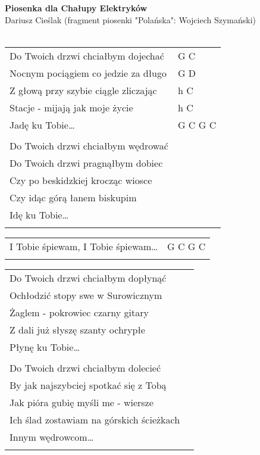 \documentclass[a5paper]{article}
\begin{document}


\noindent
\fontsize{12pt}{15pt}\selectfont
\textbf{Piosenka dla Chałupy Elektryków} \\
\fontsize{8pt}{10pt}\selectfont
Dariusz Cieślak (fragment piosenki "Polańska": Wojciech Szymański) \\ \\
\fontsize{10pt}{12pt}\selectfont
{}
\begin{tabular}{@{}p{8.00cm}p{3cm}@{}}
\noindent
Do Twoich drzwi chciałbym dojechać & G C \\
Nocnym pociągiem co jedzie za długo & G D \\
Z głową przy szybie ciągle zliczając & h C \\
Stacje - mijają jak moje życie & h C \\
Jadę ku Tobie… & G C G C \\ \\

Do Twoich drzwi chciałbym wędrować \\
Do Twoich drzwi pragnąłbym dobiec \\
Czy po beskidzkiej krocząc wiosce \\
Czy idąc górą łanem biskupim \\
Idę ku Tobie… \\ \\
\end{tabular}

\noindent
\begin{tabular}{@{}p{7.00cm}p{3cm}@{}}
I Tobie śpiewam, I Tobie śpiewam… & G C G C \\ \\
\end{tabular}

\noindent
\begin{tabular}{@{}p{7.00cm}p{3cm}@{}}
Do Twoich drzwi chciałbym dopłynąć\\
Ochłodzić stopy swe w Surowicznym\\
Żaglem - pokrowiec czarny gitary\\
Z dali już słyszę szanty ochrypłe\\
Płynę ku Tobie… \\ \\

Do Twoich drzwi chciałbym dolecieć \\
By jak najszybciej spotkać się z Tobą \\
Jak pióra gubię myśli me - wiersze \\
Ich ślad zostawiam na górskich ścieżkach \\
Innym wędrowcom… \\ \\
\end{tabular}
\end{document}
